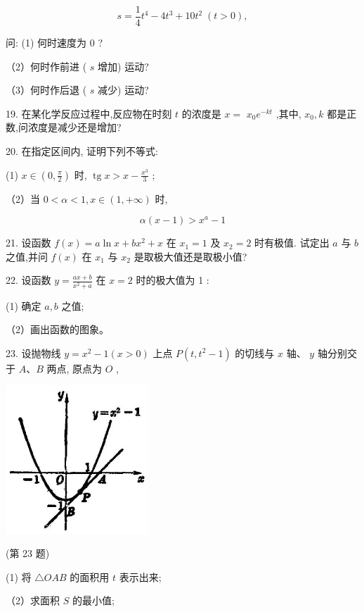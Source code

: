 \documentclass[lang=cn,newtx,10pt,scheme=chinese]{elegantbook}
\begin{document}
\[
s = \frac{1}{4}{t}^{4} - 4{t}^{3} + {10}{t}^{2}\;\left( {t > 0}\right) ,
\]

问: (1) 何时速度为 \(0\) ?

（2）何时作前进 ( \(s\) 增加) 运动?

（3）何时作后退 ( \(s\) 减少) 运动?

19. 在某化学反应过程中,反应物在时刻 \(t\) 的浓度是 \(x =\) \({x}_{0}{e}^{-{kt}}\) ,其中, \({x}_{0},k\) 都是正数,问浓度是减少还是增加?

20. 在指定区间内, 证明下列不等式:

(1) \(x \in \left( {0,\frac{\pi }{2}}\right)\) 时, \(\operatorname{tg}x > x - \frac{{x}^{3}}{3}\) ;

（2）当 \(0 < \alpha < 1,x \in \left( {1, + \infty }\right)\) 时,

\[
\alpha \left( {x - 1}\right) > {x}^{a} - 1
\]

21. 设函数 \(f\left( x\right) = a\ln x + b{x}^{2} + x\) 在 \({x}_{1} = 1\) 及 \({x}_{2} = 2\) 时有极值. 试定出 \(a\) 与 \(b\) 之值,并问 \(f\left( x\right)\) 在 \({x}_{1}\) 与 \({x}_{2}\) 是取极大值还是取极小值?

22. 设函数 \(y = \frac{{ax} + b}{{x}^{2} + a}\) 在 \(x = 2\) 时的极大值为 1 :

(1) 确定 \(a,b\) 之值;

（2）画出函数的图象。

23. 设抛物线 \(y = {x}^{2} - 1\left( {x > 0}\right)\) 上点 \(P\left( {t,{t}^{2} - 1}\right)\) 的切线与 \(x\) 轴、 \(y\) 轴分别交于 \(A\text{、}B\) 两点, 原点为 \(O\) ,

\begin{center}
\includegraphics[max width=0.4\textwidth]{images/01912c18-5c3f-733d-b775-749ba9897a9d_182_738738.jpg}
\end{center}

(第 23 题)

(1) 将 \(\bigtriangleup {OAB}\) 的面积用 \(t\) 表示出来;

（2）求面积 \(S\) 的最小值;
\end{document}
